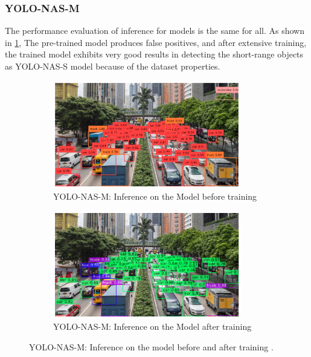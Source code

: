 \subsubsection{YOLO-NAS-M}
The performance evaluation of inference for models is the same for all. As shown in \ref{fig:sub_M1}, The pre-trained model produces false positives, and after extensive training, the trained model exhibits very good results in detecting the short-range objects as YOLO-NAS-S model because of the dataset properties.
\begin{figure}[hpbt]
  \centering
  \begin{subfigure}{\textwidth}
    \centering
    \includegraphics[width=0.9\textwidth]{tex/img/YNM2_BT_6.png}
    \caption{YOLO-NAS-M: Inference on the Model before training}
    \label{fig:sub_M1}
  \end{subfigure}
  \hfill
  \begin{subfigure}{\textwidth}
    \centering
    \includegraphics[width=0.9\textwidth]{tex/img/YNM2_AT_6.png}
    \caption{YOLO-NAS-M: Inference on the Model after training}
    \label{fig:sub_M2}
  \end{subfigure}
  \caption{YOLO-NAS-M: Inference on the model before and  after training .}
  \label{fig:NAS-M} 
\end{figure}



